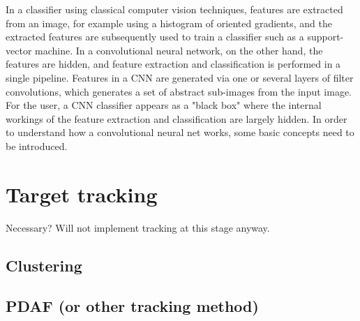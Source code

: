 In a classifier using classical computer vision techniques, features are extracted from an image, for example using a histogram of oriented gradients, and the extracted features are subsequently used to train a classifier such as a support-vector machine. In a convolutional neural network, on the other hand, the features are hidden, and feature extraction and classification is performed in a single pipeline. Features in a CNN are generated via one or several layers of filter convolutions, which generates a set of abstract sub-images from the input image. For the user, a CNN classifier appears as a "black box" where the internal workings of the feature extraction and classification are largely hidden. In order to understand how a convolutional neural net works, some basic concepts need to be introduced.
\section{Target tracking}
Necessary? Will not implement tracking at this stage anyway.
\subsection{Clustering}
\subsection{PDAF (or other tracking method)}

\cleardoublepage